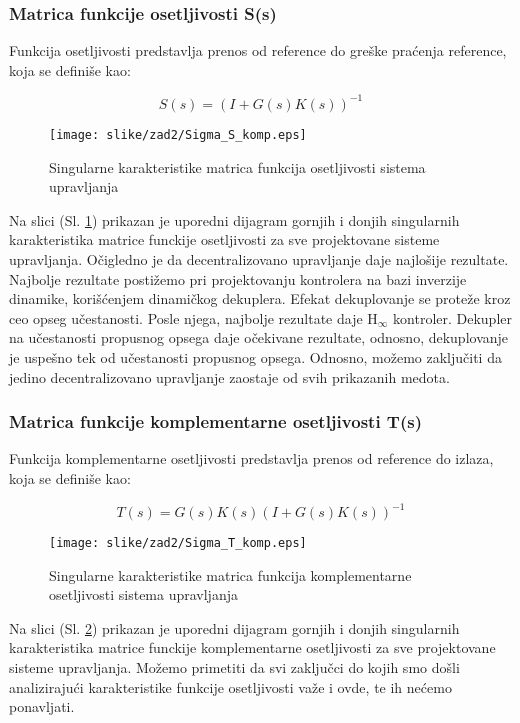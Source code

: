 \documentclass[a4paper,11pt]{article}
\theoremstyle{definition} \newtheorem{deff}{Definicija}[section]
\theoremstyle{definition} \newtheorem{prim}[deff]{Primer}
\theoremstyle{plain} \newtheorem{teor}[deff]{Teorema}
\begin{document}
			\subsubsection{Matrica funkcije osetljivosti S(s)}
			Funkcija osetljivosti predstavlja prenos od reference do greške praćenja reference, koja se definiše kao: 
			
			\begin{equation}
				S(s) = (I + G(s)K(s))^{-1}
			\end{equation}
			
			\begin{figure}[!ht]
				\centering
				\texttt{[image: slike/zad2/Sigma\_S\_komp.eps]}
				\caption{Singularne karakteristike matrica funkcija osetljivosti sistema upravljanja}
				\label{fig:sigmaS_komp}
			\end{figure}
			
			Na slici (Sl. \ref{fig:sigmaS_komp}) prikazan je uporedni dijagram gornjih i donjih singularnih karakteristika matrice funckije osetljivosti za sve projektovane sisteme upravljanja. Očigledno je da decentralizovano upravljanje daje najlošije rezultate. Najbolje rezultate postižemo pri projektovanju kontrolera na bazi inverzije dinamike, korišćenjem dinamičkog dekuplera. Efekat dekuplovanje se proteže kroz ceo opseg učestanosti. Posle njega, najbolje rezultate daje H$_\infty$ kontroler. Dekupler na učestanosti propusnog opsega daje očekivane rezultate, odnosno, dekuplovanje je uspešno tek od učestanosti propusnog opsega. Odnosno, možemo zaključiti da jedino decentralizovano upravljanje zaostaje od svih prikazanih medota. 
			
			\newpage
			\subsubsection{Matrica funkcije komplementarne osetljivosti T(s)}
			
			Funkcija komplementarne osetljivosti predstavlja prenos od reference do izlaza, koja se definiše kao: 
			
			\begin{equation}
				T(s) = G(s)K(s)(I + G(s)K(s))^{-1}
			\end{equation}
			
			
			
			\begin{figure}[!ht]
				\centering
				\texttt{[image: slike/zad2/Sigma\_T\_komp.eps]}
				\caption{Singularne karakteristike matrica funkcija komplementarne osetljivosti sistema upravljanja}
				\label{fig:sigmaT_komp}
			\end{figure}
			Na slici (Sl. \ref{fig:sigmaT_komp}) prikazan je uporedni dijagram gornjih i donjih singularnih karakteristika matrice funckije komplementarne osetljivosti za sve projektovane sisteme upravljanja. Možemo primetiti da svi zaključci do kojih smo došli analizirajući karakteristike funkcije osetljivosti važe i ovde, te ih nećemo ponavljati. 
			
\end{document}
